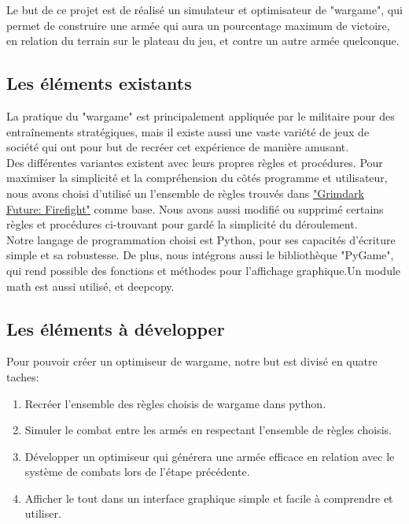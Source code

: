 \documentclass[a4paper, 11pt]{article}
\begin{document}
\begin {center}
Le but de ce projet est de réalisé un simulateur et optimisateur de "wargame", qui permet de construire une armée qui aura un pourcentage maximum de victoire, en relation du terrain sur le plateau du jeu, et contre un autre armée quelconque.
\end {center}

\subsection{Les éléments existants}

La pratique du "wargame" est principalement appliquée par le militaire pour des entraînements stratégiques, mais il existe aussi une vaste variété de jeux de société qui ont pour but de recréer cet expérience de manière amusant. \\

Des différentes variantes existent avec leurs propres règles et procédures. Pour maximiser la simplicité et la compréhension du côtés programme et utilisateur, nous avons choisi d'utilisé un l'ensemble de règles trouvés dans \href{https://onepagerules.com/portfolio/grimdark-future-firefight/}{"Grimdark Future: Firefight"} comme base. Nous avons aussi modifié ou supprimé certains règles et procédures ci-trouvant pour gardé la simplicité du déroulement. \\

Notre langage de programmation choisi est Python, pour ses capacités d'écriture simple et sa robustesse. De plus, nous intégrons aussi le bibliothèque "PyGame", qui rend possible des fonctions et méthodes pour l'affichage graphique.Un module math est aussi utilisé, et deepcopy. \\

\subsection{Les éléments à développer}

Pour pouvoir créer un optimiseur de wargame, notre but est divisé en quatre taches: \\

\begin{enumerate}

\item Recréer l'ensemble des règles choisis de wargame dans python.
\item Simuler le combat entre les armés en respectant l'ensemble de règles choisis.
\item Développer un optimiseur qui générera une armée efficace en relation avec le système de combats lors de l'étape précédente.
\item Afficher le tout dans un interface graphique simple et facile à comprendre et utiliser.

\end{enumerate}
\end{document}
